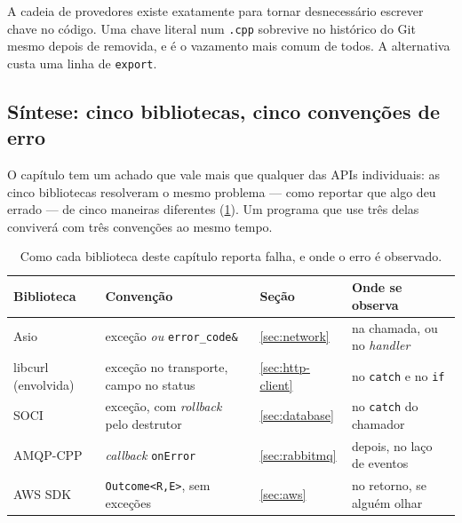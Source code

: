 \begin{regra}
A cadeia de provedores existe exatamente para tornar desnecessário escrever
chave no código. Uma chave literal num \texttt{.cpp} sobrevive no histórico do
Git mesmo depois de removida, e é o vazamento mais comum de todos. A alternativa
custa uma linha de \texttt{export}.
\end{regra}

\subsection{Síntese: cinco bibliotecas, cinco convenções de erro}

O capítulo tem um achado que vale mais que qualquer das APIs individuais: as
cinco bibliotecas resolveram o mesmo problema --- como reportar que algo deu
errado --- de cinco maneiras diferentes (\cref{tab:erros-ecossistema}). Um
programa que use três delas conviverá com três convenções ao mesmo tempo.

\begin{table}[htbp]
\centering
\caption{Como cada biblioteca deste capítulo reporta falha, e onde o erro é
         observado.}
\label{tab:erros-ecossistema}
\footnotesize
\begin{tabular}{@{}lllp{}@{}}
\toprule
\textbf{Biblioteca} & \textbf{Convenção} & \textbf{Seção} & \textbf{Onde se observa} \\
\midrule
Asio            & exceção \emph{ou} \texttt{error\_code\&} & \ref{sec:network} & na chamada, ou no \emph{handler} \\
libcurl (envolvida) & exceção no transporte, campo no status & \ref{sec:http-client} & no \texttt{catch} e no \texttt{if} \\
SOCI            & exceção, com \emph{rollback} pelo destrutor & \ref{sec:database} & no \texttt{catch} do chamador \\
AMQP-CPP        & \emph{callback} \texttt{onError}         & \ref{sec:rabbitmq} & depois, no laço de eventos \\
AWS SDK         & \texttt{Outcome<R,E>}, sem exceções      & \ref{sec:aws} & no retorno, se alguém olhar \\
\bottomrule
\end{tabular}
\end{table}

